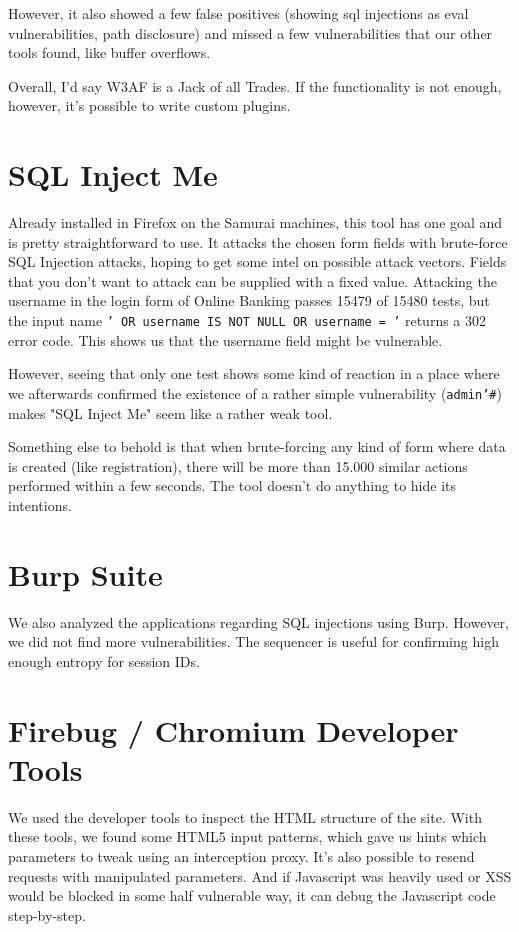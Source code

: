 However, it also showed a few false positives (showing sql injections as eval vulnerabilities, path disclosure) and missed a few vulnerabilities that our other tools found, like buffer overflows.

Overall, I'd say W3AF is a Jack of all Trades. If the functionality is not enough, however, it's possible to write custom plugins.

\section{SQL Inject Me}

Already installed in Firefox on the Samurai machines, this tool has one goal and is pretty straightforward to use. It attacks the chosen form fields with brute-force SQL Injection attacks, hoping to get some intel on possible attack vectors. Fields that you don't want to attack can be supplied with a fixed value.
Attacking the username in the login form of Online Banking passes 15479 of 15480 tests, but the input name \texttt{' OR username IS NOT NULL OR username = '} returns a 302 error code. This shows us that the username field might be vulnerable.

However, seeing that only one test shows some kind of reaction in a place where we afterwards confirmed the existence of a rather simple vulnerability (\texttt{admin'\#}) makes "SQL Inject Me" seem like a rather weak tool.

Something else to behold is that when brute-forcing any kind of form where data is created (like registration), there will be more than 15.000 similar actions performed within a few seconds. The tool doesn't do anything to hide its intentions.

\section{Burp Suite}
We also analyzed the applications regarding SQL injections using Burp. However, we did not find more vulnerabilities. The sequencer is useful for confirming high enough entropy for session IDs.

\section{Firebug / Chromium Developer Tools}
We used the developer tools to inspect the HTML structure of the site. With these tools, we found some HTML5 input patterns, which gave us hints which parameters to tweak using an interception proxy.
It's also possible to resend requests with manipulated parameters.
And if Javascript was heavily used or XSS would be blocked in some half vulnerable way, it can debug the Javascript code step-by-step.
